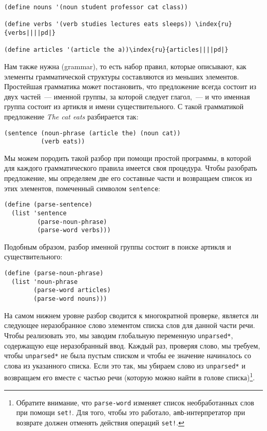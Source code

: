 \begin{Verbatim}[fontsize=\small]
(define nouns '(noun student professor cat class))

(define verbs '(verb studies lectures eats sleeps)) \index{ru}{verbs||||pd|}

(define articles '(article the a))\index{ru}{articles||||pd|}
\end{Verbatim}
Нам также нужна 
 (grammar), то есть
набор правил, которые описывают, как элементы грамматической структуры
составляются из меньших элементов.  Простейшая грамматика может
постановить, что предложение всегда состоит из двух частей~--- именной
группы, за которой следует глагол,~--- и что именная группа состоит из
артикля и имени существительного.  С такой грамматикой предложение
{\em The cat eats} разбирается так:

\begin{Verbatim}[fontsize=\small]
(sentence (noun-phrase (article the) (noun cat))
          (verb eats))
\end{Verbatim}

Мы можем породить такой разбор при помощи простой
программы, в которой для каждого грамматического правила имеется своя
процедура.  Чтобы разобрать предложение, мы определяем две его
составные части и возвращаем список из этих элементов, помеченный
символом {\tt sentence}:

\begin{Verbatim}[fontsize=\small]
(define (parse-sentence)
  (list 'sentence
         (parse-noun-phrase)
         (parse-word verbs)))
\end{Verbatim}
Подобным образом, разбор именной группы состоит в поиске артикля и
существительного:

\begin{Verbatim}[fontsize=\small]
(define (parse-noun-phrase)
  (list 'noun-phrase
        (parse-word articles)
        (parse-word nouns)))
\end{Verbatim}

На самом нижнем уровне разбор сводится к многократной
проверке, является ли следующее неразобранное слово элементом списка
слов для данной части речи.  Чтобы реализовать это, мы заводим
глобальную переменную {\tt *unparsed*}, содержащую еще
неразобранный ввод. Каждый раз, проверяя слово, мы требуем,
чтобы {\tt *unparsed*} не была пустым списком и чтобы ее
значение начиналось со слова из указанного списка.  Если это так, мы
убираем слово из {\tt *unparsed*} и возвращаем его вместе с
частью речи (которую можно найти в голове списка)\footnote{Обратите 
внимание, что {\tt parse-word}
изменяет список необработанных слов при помощи {\tt set!}.  Для
того, чтобы это работало, 
{\tt amb}-интерпретатор при возврате должен отменять действия операций
{\tt set!}.}.

